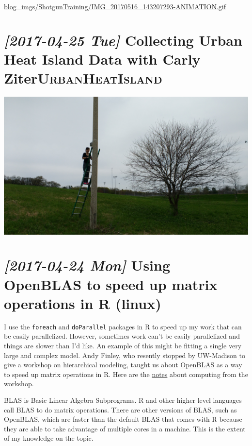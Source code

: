 \documentclass{article}
\begin{document}
\url{blog\_imgs/ShotgunTraining/IMG\_20170516\_143207293-ANIMATION.gif}

\section*{\textit{[2017-04-25 Tue] } Collecting Urban Heat Island Data with Carly Ziter\hfill{}\textsc{UrbanHeatIsland}}
\label{sec:org07fa992}
\begin{center}
\includegraphics[width=.9\linewidth]{blog_imgs/uhi_download_2017-04-25/IMG_20170425_135905884.jpg}
\end{center}

\section*{\textit{[2017-04-24 Mon] } Using OpenBLAS to speed up matrix operations in R (linux)}
\label{sec:org9c20bb9}
I use the \texttt{foreach} and \texttt{doParallel} packages in R to speed up my work
that can be easily parallelized.  However, sometimes work can't be
easily parallelized and things are slower than I'd like.  An example
of this might be fitting a single very large and complex model. Andy
Finley, who resently stopped by UW-Madison to give a workshop on
hierarchical modeling, taught us about \href{http://www.openblas.net}{OpenBLAS} as a way to speed up
matrix operations in R.  Here are the \href{http://blue.for.msu.edu/WISC17/slides/CompNotes.pdf}{notes} about computing from the
workshop.

BLAS is Basic Linear Algebra Subprograms. R and other higher level
languages call BLAS to do matrix operations.  There are other versions
of BLAS, such as OpenBLAS, which are faster than the default BLAS that
comes with R because they are able to take advantage of multiple cores
in a machine.  This is the extent of my knowledge on the topic.
\end{document}
